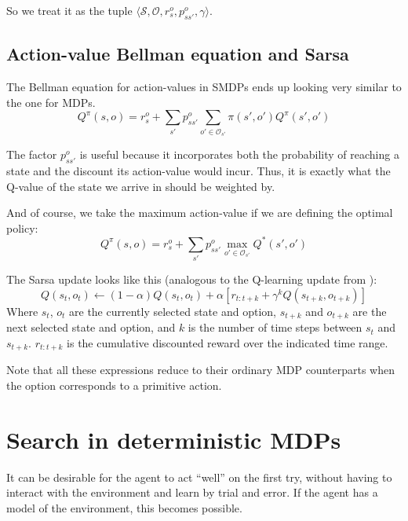 So we treat it as the tuple $\langle \mathcal{S}, \mathcal{O}, r^o_s, p^o_{ss'},
\gamma\rangle$.

\subsection{Action-value Bellman equation and Sarsa}
The Bellman equation for action-values in \acp{SMDP} ends up looking very
similar to the one for \acp{MDP}.
\begin{equation}
  Q^\pi(s, o) = r^o_s + \sum_{s'}p^o_{ss'} \sum_{o' \in \mathcal{O}_{s'}} \pi(s', o')Q^\pi(s', o')
  \label{eq:smdp-bellman-q}
\end{equation}

The factor $p^o_{ss'}$ is useful because it incorporates both the probability of
reaching a state and the discount its action-value would incur. Thus, it is
exactly what the Q-value of the state we arrive in should be weighted by.

And of course, we take the maximum action-value if we are defining the optimal policy:
\begin{equation}
  Q^\pi(s, o) = r^o_s + \sum_{s'}p^o_{ss'} \max_{o' \in \mathcal{O}_{s'}} Q^*(s', o')
\end{equation}

The Sarsa update looks like this (analogous to the Q-learning update from
\citet[Section~3.2]{sutton1999between}):
\begin{equation}
  Q(s_t, o_t) \gets (1-\alpha)Q(s_t, o_t) + \alpha \left[r_{t:t+k} + \gamma^k Q(s_{t+k}, o_{t+k}) \right]
\end{equation}
Where $s_t$, $o_t$ are the currently selected state and option, $s_{t+k}$ and
$o_{t+k}$ are the next selected state and option, and $k$ is the number of time
steps between $s_t$ and $s_{t+k}$. $r_{t:t+k}$ is the cumulative discounted
reward over the indicated time range.

Note that all these expressions reduce to their ordinary \ac{MDP} counterparts
when the option corresponds to a primitive action.

\section{Search in deterministic \acp{MDP}}

It can be desirable for the agent to act ``well'' on the first try, without
having to interact with the environment and learn by trial and error. If the
agent has a model of the environment, this becomes possible.

